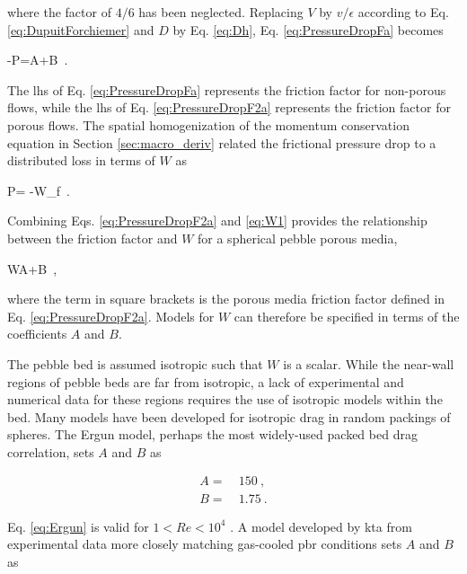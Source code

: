 \noindent where the factor of \(4/6\) has been neglected. Replacing \(V\) by \(v/\epsilon\) according to Eq. \eqref{eq:DupuitForchiemer} and \(D\) by Eq. \eqref{eq:Dh}, Eq. \eqref{eq:PressureDropFa} becomes

\beq
\label{eq:PressureDropF2a}
-\nabla P=A+B\ .
\eeq

\noindent The \gls{lhs} of Eq. \eqref{eq:PressureDropFa} represents the friction factor for non-porous flows, while the \gls{lhs} of Eq. \eqref{eq:PressureDropF2a} represents the friction factor for porous flows. The spatial homogenization of the momentum conservation equation in Section \ref{sec:macro_deriv} related the frictional pressure drop to a distributed loss in terms of \(W\) as

\beq
\label{eq:W1}
\epsilon\nabla P= -W\rho_f\ .
\eeq

\noindent Combining Eqs. \eqref{eq:PressureDropF2a} and \eqref{eq:W1} provides the relationship between the friction factor and \(W\) for a spherical pebble porous media,

\beq
W\equiv \left\lbrack A+B\right\rbrack{}\ ,
\eeq

\noindent where the term in square brackets is the porous media friction factor defined in Eq. \eqref{eq:PressureDropF2a}. Models for \(W\) can therefore be specified in terms of the coefficients \(A\) and \(B\).

The pebble bed is assumed isotropic such that \(W\) is a scalar. While the near-wall regions of pebble beds are far from isotropic, a lack of experimental and numerical data for these regions requires the use of isotropic models within the bed. Many models have been developed for isotropic drag in random packings of spheres. The Ergun model, perhaps the most widely-used packed bed drag correlation, sets \(A\) and \(B\) as \cite{ergun}

\begin{subequations}
\label{eq:Ergun}
\begin{align}
A=&\ 150\ ,\\
B=&\ 1.75\ .
\end{align}
\end{subequations}

\noindent Eq. \eqref{eq:Ergun} is valid for \(1<Re<10^4\) \cite{eisfeld,nield,ergun,avigni}. A model developed by \gls{kta} from experimental data more closely matching gas-cooled \gls{pbr} conditions sets \(A\) and \(B\) as \cite{KTA}

